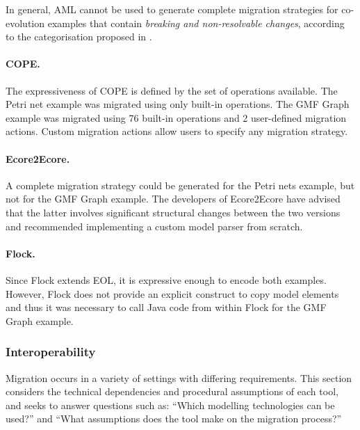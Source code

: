 In general, AML cannot be used to generate complete migration strategies for co-evolution examples that contain \emph{breaking and non-resolvable changes}, according to the categorisation proposed in \cite{gruschko07towards}. 

\paragraph{COPE.} The expressiveness of COPE is defined by the set of operations available. The Petri net example was migrated using only built-in operations. The GMF Graph example was migrated using 76 built-in operations and 2 user-defined migration actions. Custom migration actions allow users to specify any migration strategy.

\paragraph{Ecore2Ecore.} A complete migration strategy could be generated for the Petri nets example, but not for the GMF Graph example. The developers of Ecore2Ecore have advised that the latter involves significant structural changes between the two versions and recommended implementing a custom model parser from scratch.

\paragraph{Flock.} Since Flock extends EOL, it is expressive enough to encode both examples. However, Flock does not provide an explicit construct to copy model elements and thus it was necessary to call Java code from within Flock for the GMF Graph example.



\subsubsection{Interoperability}
Migration occurs in a variety of settings with differing requirements. This section considers the technical dependencies and procedural assumptions of each tool, and seeks to answer questions such as: ``Which modelling technologies can be used?'' and ``What assumptions does the tool make on the migration process?''



